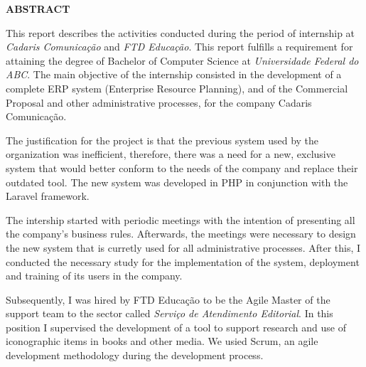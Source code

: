 \documentclass[
  12pt,            %
  openany,
  oneside,
  a4paper,         %
  english,      %
  brazil
]{article}
\numberwithin{figure}{section}
\numberwithin{table}{section}
\begin{document}
\begin{titlepage}

\begin{center}
  \textbf{ABSTRACT}
\end{center}

This report describes the activities conducted during the period of internship at \textit{Cadaris Comunicação} and \textit{FTD Educação}. This report fulfills a requirement for attaining the degree of Bachelor of Computer Science at \textit{Universidade Federal do ABC}. The main objective of the internship consisted in the development of a complete ERP system (Enterprise Resource Planning), and of the Commercial Proposal and other administrative processes, for the company Cadaris Comunicação. 

The justification for the project is that the previous system used by the organization was inefficient, therefore, there was a need for a new, exclusive system that would better conform to the needs of the company and replace their outdated tool. The new system was developed in PHP in conjunction with the Laravel framework.

The intership started with periodic meetings with the intention of presenting all the company's business rules. Afterwards, the meetings were necessary to design the new system that is curretly used for all administrative processes. After this, I conducted the necessary study for the implementation of the system, deployment and training of its users in the company.

Subsequently, I was hired by FTD Educação to be the Agile Master of the support team to the sector called \textit{Serviço de Atendimento Editorial}. In this position I supervised the development of a tool to support research and use of iconographic items in books and other media. We usied Scrum, an agile development methodology during the development process. 

\end{titlepage}



\begin{titlepage}

\begin{singlespace}
  \listoffigures
\end{singlespace}

\end{titlepage}


\end{document}
